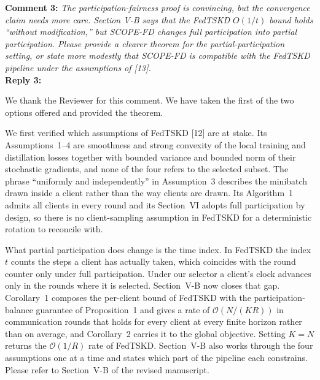 \documentclass[10pt]{article}
\begin{document}
\noindent
\textbf{Comment 3:} \textit{The participation-fairness proof is convincing, but the convergence claim needs more care. Section V-B says that the FedTSKD $O(1/t)$ bound holds ``without modification,'' but SCOPE-FD changes full participation into partial participation. Please provide a clearer theorem for the partial-participation setting, or state more modestly that SCOPE-FD is compatible with the FedTSKD pipeline under the assumptions of [13].} \\
\noindent
\textbf{Reply 3:} {We thank the Reviewer for this comment. We have taken the first of the two options offered and provided the theorem.

We first verified which assumptions of FedTSKD [12] are at stake. Its Assumptions~1--4 are smoothness and strong convexity of the local training and distillation losses together with bounded variance and bounded norm of their stochastic gradients, and none of the four refers to the selected subset. The phrase ``uniformly and independently'' in Assumption~3 describes the minibatch drawn inside a client rather than the way clients are drawn. Its Algorithm~1 admits all clients in every round and its Section~VI adopts full participation by design, so there is no client-sampling assumption in FedTSKD for a deterministic rotation to reconcile with.

What partial participation does change is the time index. In FedTSKD the index $t$ counts the steps a client has actually taken, which coincides with the round counter only under full participation. Under our selector a client's clock advances only in the rounds where it is selected. Section~V-B now closes that gap. Corollary~1 composes the per-client bound of FedTSKD with the participation-balance guarantee of Proposition~1 and gives a rate of $\mathcal{O}(N/(KR))$ in communication rounds that holds for every client at every finite horizon rather than on average, and Corollary~2 carries it to the global objective. Setting $K=N$ returns the $\mathcal{O}(1/R)$ rate of FedTSKD. Section~V-B also works through the four assumptions one at a time and states which part of the pipeline each constrains. Please refer to Section~V-B of the revised manuscript.}\\
\end{document}

